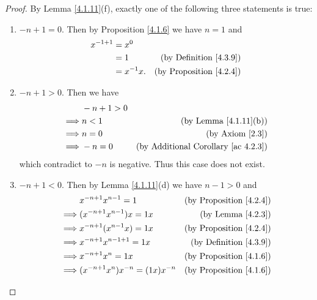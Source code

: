 \begin{proof}
    By Lemma \ref{4.1.11}(f), exactly one of the following three statements is true:
    \begin{enumerate}[label=(\Roman*)]
        \item \(-n + 1 = 0\).
              Then by Proposition \ref{4.1.6} we have \(n = 1\) and
              \begin{align*}
                  x^{-1 + 1} & = x^0                                             \\
                             & = 1         & \text{(by Definition \ref{4.3.9})}  \\
                             & = x^{-1} x. & \text{(by Proposition \ref{4.2.4})}
              \end{align*}
        \item \(-n + 1 > 0\).
              Then we have
              \begin{align*}
                           & -n + 1 > 0                                                   \\
                  \implies & n < 1      & \text{(by Lemma \ref{4.1.11}(b))}               \\
                  \implies & n = 0      & \text{(by Axiom \ref{2.3})}                     \\
                  \implies & -n = 0     & \text{(by Additional Corollary \ref{ac 4.2.3})}
              \end{align*}
              which contradict to \(-n\) is negative.
              Thus this case does not exist.
        \item \(-n + 1 < 0\).
              Then by Lemma \ref{4.1.11}(d) we have \(n - 1 > 0\) and
              \begin{align*}
                           & x^{-n + 1} x^{n - 1} = 1              & \text{(by Proposition \ref{4.2.4})} \\
                  \implies & (x^{-n + 1} x^{n - 1}) x = 1x         & \text{(by Lemma \ref{4.2.3})}       \\
                  \implies & x^{-n + 1} (x^{n - 1} x) = 1x         & \text{(by Proposition \ref{4.2.4})} \\
                  \implies & x^{-n + 1} x^{n - 1 + 1} = 1x         & \text{(by Definition \ref{4.3.9})}  \\
                  \implies & x^{-n + 1} x^n = 1x                   & \text{(by Proposition \ref{4.1.6})} \\
                  \implies & (x^{-n + 1} x^n) x^{-n} = (1x) x^{-n} & \text{(by Proposition \ref{4.1.6})} \\

\end{align*}
\end{enumerate}
\end{proof}
